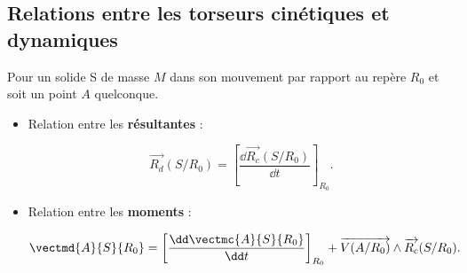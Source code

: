 %
%
%
%
%

\subsection{Relations entre les torseurs cinétiques et dynamiques}
\begin{prop}
Pour un solide S de masse $M$ dans son mouvement par rapport au repère $R_0$ et soit un point $A$ quelconque.
\begin{itemize}
\item Relation entre les \textbf{résultantes} :

$$
\overrightarrow{R_d}(S/R_0)=\left[\frac{\dd \overrightarrow{R_c}(S/R_0)}{\dd t}\right]_{R_0}.
$$
\item Relation entre les \textbf{moments} :

$$
\vectmd{A}{S}{R_0}=\left[\frac{\dd \vectmc{A}{S}{R_0}}{\dd t}\right]_{R_0}+\overrightarrow{V(A/R_0)}\wedge \overrightarrow{R_c}(S/R_0).
$$
\end{itemize}
\end{prop}




